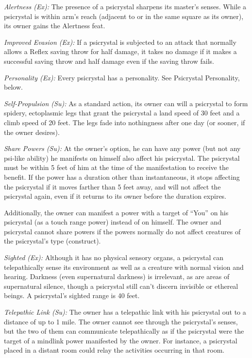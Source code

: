 \textit{Alertness (Ex):} The presence of a psicrystal sharpens its master’s senses. While a psicrystal is within arm’s reach (adjacent to or in the same square as its owner), its owner gains the Alertness feat.

\textit{Improved Evasion (Ex):} If a psicrystal is subjected to an attack that normally allows a Reflex saving throw for half damage, it takes no damage if it makes a successful saving throw and half damage even if the saving throw fails.

\textit{Personality (Ex):} Every psicrystal has a personality. See Psicrystal Personality, below.

\textit{Self-Propulsion (Su):} As a standard action, its owner can will a psicrystal to form spidery, ectoplasmic legs that grant the psicrystal a land speed of 30 feet and a climb speed of 20 feet. The legs fade into nothingness after one day (or sooner, if the owner desires).

\textit{Share Powers (Su):} At the owner’s option, he can have any power (but not any psi-like ability) he manifests on himself also affect his psicrystal. The psicrystal must be within 5 feet of him at the time of the manifestation to receive the benefit. If the power has a duration other than instantaneous, it stops affecting the psicrystal if it moves farther than 5 feet away, and will not affect the psicrystal again, even if it returns to its owner before the duration expires.

Additionally, the owner can manifest a power with a target of “You” on his psicrystal (as a touch range power) instead of on himself. The owner and psicrystal cannot share powers if the powers normally do not affect creatures of the psicrystal’s type (construct).

\textit{Sighted (Ex):} Although it has no physical sensory organs, a psicrystal can telepathically sense its environment as well as a creature with normal vision and hearing. Darkness (even supernatural darkness) is irrelevant, as are areas of supernatural silence, though a psicrystal still can’t discern invisible or ethereal beings. A psicrystal’s sighted range is 40 feet.

\textit{Telepathic Link (Su):} The owner has a telepathic link with his psicrystal out to a distance of up to 1 mile. The owner cannot see through the psicrystal’s senses, but the two of them can communicate telepathically as if the psicrystal were the target of a mindlink power manifested by the owner. For instance, a psicrystal placed in a distant room could relay the activities occurring in that room.

